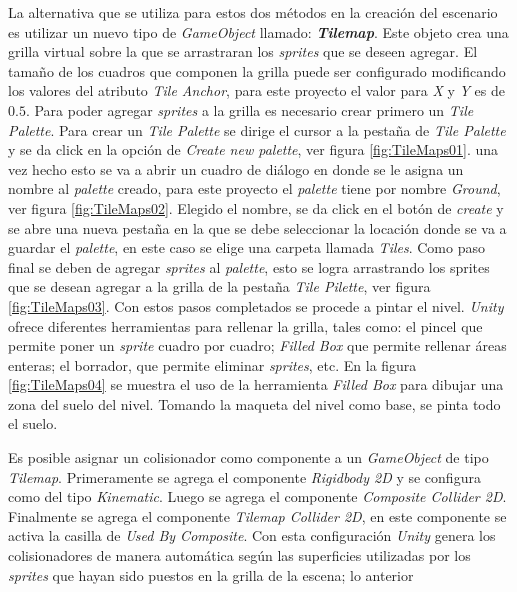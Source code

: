 La alternativa que se utiliza para estos dos métodos en la creación del
escenario es utilizar un nuevo tipo de \textit{GameObject} llamado:
\textit{\textbf{Tilemap}}. Este objeto crea una grilla virtual sobre la que se
arrastraran los \textit{sprites} que se deseen agregar. El tamaño de los cuadros
que componen la grilla puede ser configurado modificando los valores del atributo
\textit{Tile Anchor}, para este proyecto el valor para \textit{X} y \textit{Y}
es de $0.5$. Para poder agregar \textit{sprites} a la grilla es necesario crear
primero un \textit{Tile Palette}. Para crear un \textit{Tile Palette} se dirige
el cursor a la pestaña de \textit{Tile Palette} y se da click en la opción de
\textit{Create new palette}, ver figura \ref{fig:TileMaps01}. una vez hecho esto
se va a abrir un cuadro de diálogo en donde se le asigna un nombre al
\textit{palette} creado, para este proyecto el \textit{palette} tiene por nombre
\textit{Ground}, ver figura \ref{fig:TileMaps02}. Elegido el nombre, se da click
en el botón de \textit{create} y se abre una nueva pestaña en la que se debe
seleccionar la locación donde se va a guardar el \textit{palette}, en este caso
se elige una carpeta llamada \textit{Tiles}. Como paso final se deben de agregar
\textit{sprites} al \textit{palette}, esto se logra arrastrando los sprites que
se desean agregar a la grilla de la pestaña \textit{Tile Pilette}, ver figura
\ref{fig:TileMaps03}. Con estos pasos completados se procede a pintar el nivel.
\textit{Unity} ofrece diferentes herramientas para rellenar la grilla, tales
como: el pincel que permite poner un \textit{sprite} cuadro por cuadro;
\textit{Filled Box} que permite rellenar áreas enteras; el borrador, que permite
eliminar \textit{sprites}, etc. En la figura \ref{fig:TileMaps04} se muestra el
uso de la herramienta \textit{Filled Box} para dibujar una zona del suelo del
nivel. Tomando la maqueta del nivel como base, se pinta todo el suelo.
\\
\par
Es posible asignar un colisionador como componente a un \textit{GameObject} de
tipo \textit{Tilemap}. Primeramente se agrega el componente \textit{Rigidbody
2D} y se configura como del tipo \textit{Kinematic}. Luego se agrega el
componente \textit{Composite Collider 2D}. Finalmente se agrega el componente
\textit{Tilemap Collider 2D}, en este componente se activa la casilla de
\textit{Used By Composite}. Con esta configuración \textit{Unity} genera los
colisionadores de manera automática según las superficies utilizadas por los
\textit{sprites} que hayan sido puestos en la grilla de la escena; lo anterior
